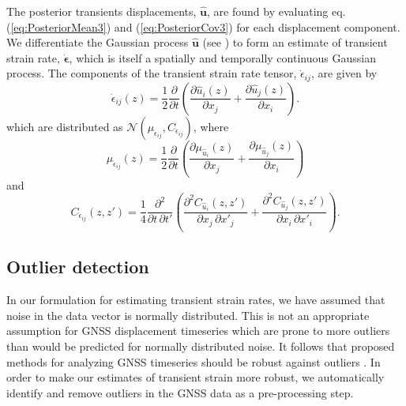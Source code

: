\documentclass[10pt,a4paper]{article}
\begin{document}
The posterior transients displacements, $\hat{\bm{u}}$, are found by evaluating eq. (\ref{eq:PosteriorMean3}) and (\ref{eq:PosteriorCov3}) for each displacement component. We differentiate the Gaussian process $\hat{\bm{u}}$ (see \cite{Abrahamsen1997}) to form an estimate of transient strain rate, $\dot{\bm{\epsilon}}$, which is itself a spatially and temporally continuous Gaussian process. The components of the transient strain rate tensor, $\dot{\epsilon}_{ij}$, are given by
\begin{equation}\label{eq:StrainRate}
\dot{\epsilon}_{ij}(z) = \frac{1}{2} \frac{\partial}{\partial t} \left(
                                     \frac{\partial \hat{u}_i(z)}{\partial x_j} +  
                                     \frac{\partial \hat{u}_j(z)}{\partial x_i}\right).
\end{equation}
which are distributed as $\mathcal{N}(\mu_{\dot{\epsilon}_{ij}},C_{\dot{\epsilon}_{ij}})$, where
\begin{equation}\label{eq:StrainMean}
\mu_{\dot{\epsilon}_{ij}}(z) = \frac{1}{2}\frac{\partial}{\partial t}\left(
                               \frac{\partial \mu_{\hat{u}_i}(z)}{\partial x_j} + 
                               \frac{\partial \mu_{\hat{u}_j}(z)}{\partial x_i} \right)
\end{equation} 
and  
\begin{equation}\label{eq:StrainCov}
C_{\dot{\epsilon}_{ij}}(z,z') = \frac{1}{4} \frac{\partial^2}{\partial t \, \partial t'}\left(
                           \frac{\partial^2 C_{\hat{u}_i}(z,z')}{\partial x_j \, \partial x'_j} + 
                           \frac{\partial^2 C_{\hat{u}_j}(z,z')}{\partial x_i \, \partial x'_i} \right).
\end{equation} 

\subsection{Outlier detection}
In our formulation for estimating transient strain rates, we have assumed that noise in the data vector is normally distributed. This is not an appropriate assumption for GNSS displacement timeseries which are prone to more outliers than would be predicted for normally distributed noise. It follows that proposed methods for analyzing GNSS timeseries should be robust against outliers \citep[e.g.,][]{Blewitt2016}. In order to make our estimates of transient strain more robust, we automatically identify and remove outliers in the GNSS data as a pre-processing step.
\end{document}
